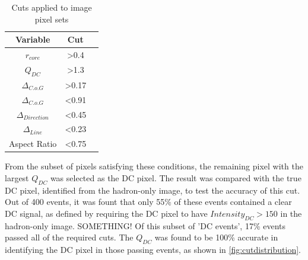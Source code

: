 \documentclass[]{article}
\begin{document}
\begin{table}[h!]
  \centering
  \caption{Cuts applied to image pixel sets}
  \label{tab:table1}
  \begin{tabular}{ccc}
    \toprule
    Variable & Cut\\
    \midrule
     $r_{core}$ & \textgreater 0.4 \\
     $Q_{DC}$ & \textgreater 1.3 \\
     $ \Delta_{C.o.G}$ & \textgreater 0.17 \\
     $ \Delta_{C.o.G}$ & \textless 0.91 \\
     $\Delta_{Direction}$ & \textless 0.45 \\
     $\Delta_{Line}$ & \textless 0.23 \\
     Aspect Ratio & \textless 0.75 \\
    \bottomrule
  \end{tabular}
\end{table}

From the subset of pixels satisfying these conditions, the remaining pixel with the largest $Q_{DC}$ was selected as the DC pixel. The result was compared with the true DC pixel, identified from the hadron-only image, to test the accuracy of this cut. Out of 400 events, it was fount that only 55\% of these events contained a clear DC signal, as defined by requiring the DC pixel to have $Intensity_{DC} > 150$ in the hadron-only image. SOMETHING! Of this subset of 'DC events', 17\% events passed all of the required cuts. The $Q_{DC}$ was found to be 100\% accurate in identifying the DC pixel in those passing events, as shown in \ref{fig:cutdistribution}.
\end{document}
